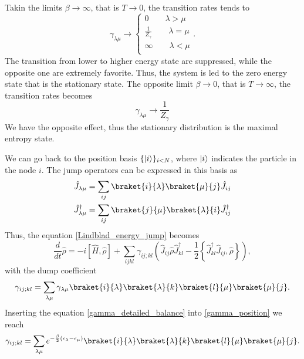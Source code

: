 Takin the limits $\beta \rightarrow \infty$, that is $T  \rightarrow 0$, the transition rates tends to
\begin{equation}
    \gamma_{\lambda\mu} \rightarrow \left\{\begin{aligned}
        0 \qquad \lambda > \mu\\
        \frac{1}{Z_\gamma} \qquad \lambda = \mu\\
        \infty \qquad  \lambda < \mu \\
    \end{aligned}\right. . 
\end{equation}
The transition from lower to higher energy state are suppressed, while the opposite one are extremely favorite. Thus, the system is led to the zero energy state that is the stationary state. 
The opposite limit $\beta \rightarrow 0$, that is $T \rightarrow \infty$, the transition rates becomes
\begin{equation}
    \gamma_{\lambda\mu} \rightarrow \frac{1}{Z_\gamma}
\end{equation}
We have the opposite effect, thus the stationary distribution is the maximal entropy state.

We can go back to the position basis $\{\lvert i\rangle\}_{i<N}$, where $\lvert i\rangle$ indicates the particle in the node $i$.  
The jump operators can be expressed in this basis as
\begin{align}
    \hat J_{\lambda\mu} = \sum_{ij} \braket{i}{\lambda}\braket{\mu}{j}\hat J_{ij}\\
    \hat J_{\lambda\mu}^\dagger = \sum_{ij} \braket{j}{\mu}\braket{\lambda}{i}\hat J_{ij}^\dagger
\end{align}
Thus, the equation \eqref{Lindblad_energy_jump} becomes
\begin{equation}\label{quantum_network_position}
    \frac{d}{dt}\hat\rho = -i\left[\hat H,\hat\rho\right] +\sum_{ijkl} \gamma_{ij;kl} \left(\hat J_{ij}\hat\rho \hat J_{kl}^\dagger - \frac{1}{2}\left\{ \hat J_{kl}^\dagger\hat J_{ij}, \hat\rho\right\} \right),
\end{equation}
with the dump coefficient
\begin{equation}\label{gamma_position}
    \gamma_{ij;kl}= \sum_{\lambda\mu}\gamma_{\lambda\mu}\braket{i}{\lambda}\braket{\lambda}{k}\braket{l}{\mu}\braket{\mu}{j}.
\end{equation}
Inserting the equation \eqref{gamma_detailed_balance} into \eqref{gamma_position} we reach
\begin{equation}
    \gamma_{ij;kl}= \sum_{\lambda\mu}e^{-\frac{\beta}{2}\left(\epsilon_\lambda - \epsilon_\mu\right)}\braket{i}{\lambda}\braket{\lambda}{k}\braket{l}{\mu}\braket{\mu}{j}.
\end{equation}

